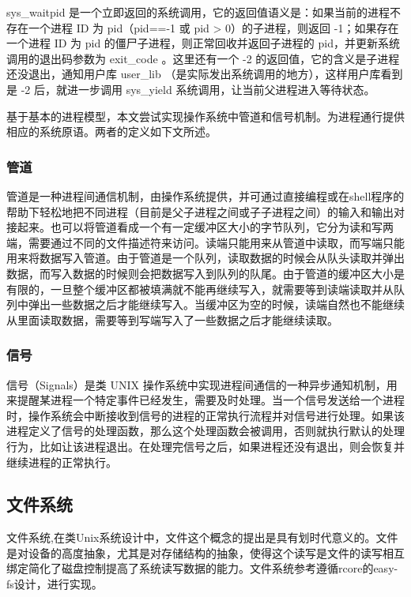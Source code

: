 sys\_waitpid 是一个立即返回的系统调用，它的返回值语义是：如果当前的进程不存在一个进程 ID 为 pid（pid==-1 或 pid > 0）的子进程，则返回 -1；如果存在一个进程 ID 为 pid 的僵尸子进程，则正常回收并返回子进程的 pid，并更新系统调用的退出码参数为 exit\_code 。这里还有一个 -2 的返回值，它的含义是子进程还没退出，通知用户库 user\_lib （是实际发出系统调用的地方），这样用户库看到是 -2 后，就进一步调用 sys\_yield 系统调用，让当前父进程进入等待状态。

基于基本的进程模型，本文尝试实现操作系统中管道和信号机制。为进程通行提供相应的系统原语。两者的定义如下文所述。

\subsubsection{管道}


管道是一种进程间通信机制，由操作系统提供，并可通过直接编程或在shell程序的帮助下轻松地把不同进程（目前是父子进程之间或子子进程之间）的输入和输出对接起来。也可以将管道看成一个有一定缓冲区大小的字节队列，它分为读和写两端，需要通过不同的文件描述符来访问。读端只能用来从管道中读取，而写端只能用来将数据写入管道。由于管道是一个队列，读取数据的时候会从队头读取并弹出数据，而写入数据的时候则会把数据写入到队列的队尾。由于管道的缓冲区大小是有限的，一旦整个缓冲区都被填满就不能再继续写入，就需要等到读端读取并从队列中弹出一些数据之后才能继续写入。当缓冲区为空的时候，读端自然也不能继续从里面读取数据，需要等到写端写入了一些数据之后才能继续读取。

\subsubsection{信号}

信号（Signals）是类 UNIX 操作系统中实现进程间通信的一种异步通知机制，用来提醒某进程一个特定事件已经发生，需要及时处理。当一个信号发送给一个进程时，操作系统会中断接收到信号的进程的正常执行流程并对信号进行处理。如果该进程定义了信号的处理函数，那么这个处理函数会被调用，否则就执行默认的处理行为，比如让该进程退出。在处理完信号之后，如果进程还没有退出，则会恢复并继续进程的正常执行。

\subsection{文件系统}

文件系统,在类Unix系统设计中，文件这个概念的提出是具有划时代意义的。文件是对设备的高度抽象，尤其是对存储结构的抽象，使得这个读写是文件的读写相互绑定简化了磁盘控制提高了系统读写数据的能力。文件系统参考遵循rcore的easy-fs设计，进行实现。

